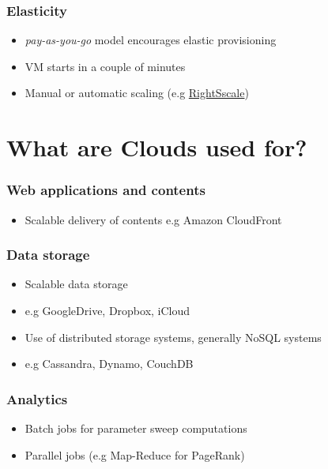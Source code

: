 \documentclass[bigger,hyperref={colorlinks=true, urlcolor=red, plainpages=false, pdfpagelabels, bookmarksnumbered}]{beamer}
\begin{document}
\begin{frame}
\frametitle{Elasticity}
\label{sec-2-7}

\begin{itemize}
\item \emph{pay-as-you-go} model encourages elastic provisioning
\item VM starts in a couple of minutes
\item Manual or automatic scaling (e.g \href{http://www.rightscale.com}{RightSscale})
\end{itemize}
\end{frame}
\section{What are Clouds used for?}
\label{sec-3}
\begin{frame}
\frametitle{Web applications and contents}
\label{sec-3-1}

\begin{itemize}
\item Scalable delivery of contents 
     e.g Amazon CloudFront
\end{itemize}
\end{frame}
\begin{frame}
\frametitle{Data storage}
\label{sec-3-2}

\begin{itemize}
\item Scalable data storage
\item e.g GoogleDrive, Dropbox, iCloud
\item Use of distributed storage systems, generally NoSQL systems
\item e.g Cassandra, Dynamo, CouchDB
\end{itemize}
\end{frame}
\begin{frame}
\frametitle{Analytics}
\label{sec-3-3}

\begin{itemize}
\item Batch jobs for parameter sweep computations
\item Parallel jobs  (e.g Map-Reduce for PageRank)
\end{itemize}
\end{frame}
\end{document}
